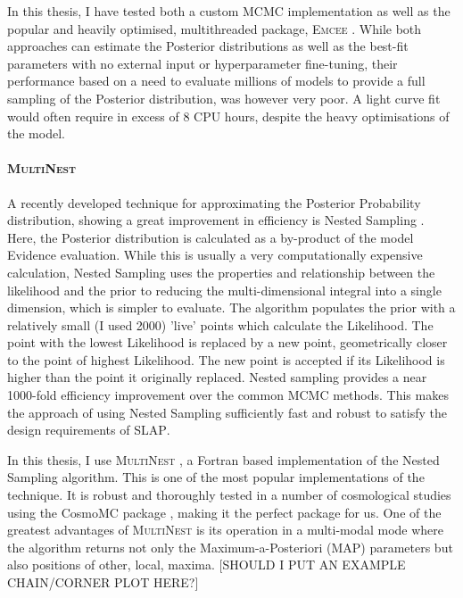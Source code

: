 In this thesis, I have tested both a custom MCMC implementation as well as the popular and heavily optimised, multithreaded package, \textsc{Emcee} \citep{Foreman-Mackey2012}. While both approaches can estimate the Posterior distributions as well as the best-fit parameters with no external input or hyperparameter fine-tuning, their performance based on a need to evaluate millions of models to provide a full sampling of the Posterior distribution, was however very poor. A light curve fit would often require in excess of 8 CPU hours, despite the heavy optimisations of the model.

\paragraph{\textsc{MultiNest}}
A recently developed technique for approximating the Posterior Probability distribution, showing a great improvement in efficiency is Nested Sampling \citep{Skilling2006}. Here, the Posterior distribution is calculated as a by-product of the model Evidence evaluation. While this is usually a very computationally expensive calculation, Nested Sampling uses the properties and relationship between the likelihood and the prior to reducing the multi-dimensional integral into a single dimension, which is simpler to evaluate. The algorithm populates the prior with a relatively small (I used 2000) 'live' points which calculate the Likelihood. The point with the lowest Likelihood is replaced by a new point, geometrically closer to the point of highest Likelihood. The new point is accepted if its Likelihood is higher than the point it originally replaced. Nested sampling provides a near 1000-fold efficiency improvement over the common MCMC methods. This makes the approach of using Nested Sampling sufficiently fast and robust to satisfy the design requirements of \textsc{SLAP}.

In this thesis, I use \textsc{MultiNest} \citep{Feroz2009,Feroz2011,Feroz2013}, a Fortran based implementation of the Nested Sampling algorithm. This is one of the most popular implementations of the technique. It is robust and thoroughly tested in a number of cosmological studies using the CosmoMC package \citep{Lewis2002}, making it the perfect package for us. One of the greatest advantages of \textsc{MultiNest} is its operation in a multi-modal mode where the algorithm returns not only the Maximum-a-Posteriori (MAP) parameters but also positions of other, local, maxima. [SHOULD I PUT AN EXAMPLE CHAIN/CORNER PLOT HERE?]

